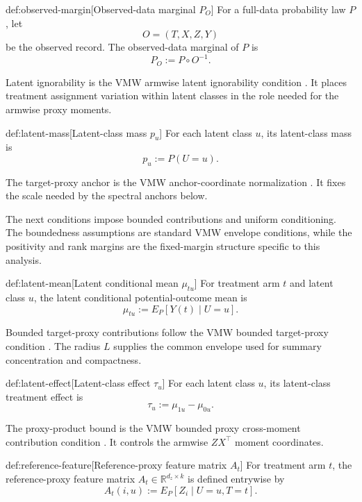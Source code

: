 \begin{definitionv}{def:observed-margin}[Observed-data marginal \(P_O\)]
For a full-data probability law \(P\), let
\[
O=(T,X,Z,Y)
\]
be the observed record. The observed-data marginal of \(P\) is
\[
P_O:=P\circ O^{-1}.
\]
\end{definitionv}

Latent ignorability is the VMW armwise latent ignorability condition \citep{VirkMazaheriWu2026}. It places treatment assignment variation within latent classes in the role needed for the armwise proxy moments.

\begin{definitionv}{def:latent-mass}[Latent-class mass \(p_u\)]
For each latent class \(u\), its latent-class mass is
\[
p_u:=P(U=u).
\]
\end{definitionv}

The target-proxy anchor is the VMW anchor-coordinate normalization \citep{VirkMazaheriWu2026}. It fixes the scale needed by the spectral anchors below.

The next conditions impose bounded contributions and uniform conditioning. The boundedness assumptions are standard VMW envelope conditions, while the positivity and rank margins are the fixed-margin structure specific to this analysis.

\begin{definitionv}{def:latent-mean}[Latent conditional mean \(\mu_{tu}\)]
For treatment arm \(t\) and latent class \(u\), the latent conditional potential-outcome mean is
\[
\mu_{tu}:=E_P\!\left[Y(t)\mid U=u\right].
\]
\end{definitionv}

Bounded target-proxy contributions follow the VMW bounded target-proxy condition \citep{VirkMazaheriWu2026}. The radius \(L\) supplies the common envelope used for summary concentration and compactness.

\begin{definitionv}{def:latent-effect}[Latent-class effect \(\tau_u\)]
For each latent class \(u\), its latent-class treatment effect is
\[
\tau_u:=\mu_{1u}-\mu_{0u}.
\]
\end{definitionv}

The proxy-product bound is the VMW bounded proxy cross-moment contribution condition \citep{VirkMazaheriWu2026}. It controls the armwise \(ZX^\top\) moment coordinates.

\begin{definitionv}{def:reference-feature}[Reference-proxy feature matrix \(A_t\)]
For treatment arm \(t\), the reference-proxy feature matrix \(A_t\in\mathbb R^{d_z\times k}\) is defined entrywise by
\[
A_t(i,u):=E_P\!\left[Z_i\mid U=u,T=t\right].
\]
\end{definitionv}


